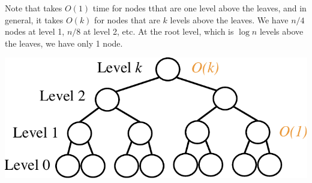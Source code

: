 {
    \setlength\columnsep{4em}
    \begin{multicols}{2}
        
        Note that  takes $O(1)$ time for nodes tthat are one level above the leaves, and in general, it takes $O(k)$ for nodes that are $k$ levels above the leaves.
        We have $n / 4$ nodes at level 1, $n / 8$ at level 2, etc. At the root level, which is $\log n$ levels above the leaves, we have only 1 node.

        \includegraphics[width=\linewidth]{figures/build_max_heap.pdf}
    \end{multicols}
}